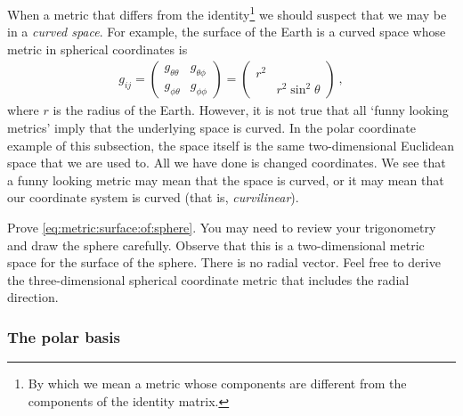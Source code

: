 \documentclass[12pt, oneside]{report}    %
\begin{document}
When a metric that differs from the identity\footnote{By which we mean a metric whose components are different from the components of the identity matrix.} we should suspect that we may be in a \emph{curved space}. For example, the surface of the Earth is a curved space whose metric in spherical coordinates is
\begin{align}
    g_{ij} = 
    \begin{pmatrix}
        g_{\theta\theta} & g_{\theta\phi}\\
        g_{\phi\theta} & g_{\phi\phi}
    \end{pmatrix}
    =
    \begin{pmatrix}
        r^2 & \\
        & r^2 \sin^2\theta
    \end{pmatrix} \ ,
    \label{eq:metric:surface:of:sphere}
\end{align}
where $r$ is the radius of the Earth. However, it is not true that all `funny looking metrics' imply that the underlying space is curved. In the polar coordinate example of this subsection, the space itself is the same two-dimensional Euclidean space that we are used to. All we have done is changed coordinates. We see that a funny looking metric may mean that the space is curved, or it may mean that our coordinate system is curved (that is, \emph{curvilinear}). 


\begin{exercise}
Prove \eqref{eq:metric:surface:of:sphere}. You may need to review your trigonometry and draw the sphere carefully. Observe that this is a two-dimensional metric space for the surface of the sphere. There is no radial vector. Feel free to derive the three-dimensional spherical coordinate metric that includes the radial direction. 
\end{exercise}

\subsubsection{The polar basis}
\end{document}
